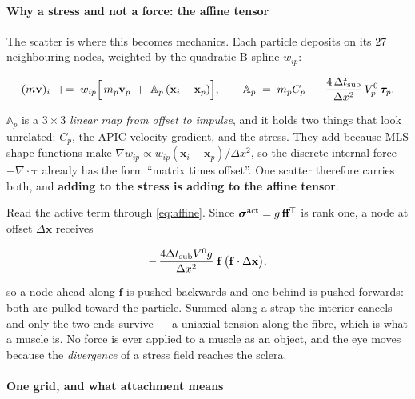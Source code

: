 \documentclass[10pt]{article}
\begin{document}
\paragraph{Why a stress and not a force: the affine tensor}

The scatter is where this becomes mechanics. Each particle deposits on its $27$ neighbouring
nodes, weighted by the quadratic B-spline $w_{ip}$:

\begin{equation}
(m\mathbf{v})_i \;\mathrel{+}=\; w_{ip}\Big[\,m_p\mathbf{v}_p \;+\; \mathbb{A}_p\,(\mathbf{x}_i-\mathbf{x}_p)\Big],
\qquad
\mathbb{A}_p \;=\; m_p C_p \;-\; \frac{4\,\Delta t_{\rm sub}}{\Delta x^{2}}\,V^{0}_p\,\boldsymbol\tau_p .
\label{eq:affine}
\end{equation}

$\mathbb{A}_p$ is a $3\times3$ \emph{linear map from offset to impulse}, and it holds two
things that look unrelated: $C_p$, the APIC velocity gradient, and the stress. They add
because MLS shape functions make $\nabla w_{ip}\propto
w_{ip}(\mathbf{x}_i-\mathbf{x}_p)/\Delta x^2$, so the discrete internal force
$-\nabla\!\cdot\!\boldsymbol\tau$ already has the form ``matrix times offset''. One scatter
therefore carries both, and \textbf{adding to the stress is adding to the affine tensor}.

Read the active term through \eqref{eq:affine}. Since $\boldsymbol\sigma^{\rm
act}=g\,\mathbf{f}\mathbf{f}^{\!\top}$ is rank one, a node at offset $\Delta\mathbf{x}$
receives

\begin{equation}
-\,\frac{4\Delta t_{\rm sub}V^0 g}{\Delta x^{2}}\;\mathbf{f}\,\big(\mathbf{f}\cdot\Delta\mathbf{x}\big),
\label{eq:rank1}
\end{equation}

so a node ahead along $\mathbf{f}$ is pushed backwards and one behind is pushed forwards:
both are pulled toward the particle. Summed along a strap the interior cancels and only the
two ends survive --- a uniaxial tension along the fibre, which is what a muscle is. No force
is ever applied to a muscle as an object, and the eye moves because the \emph{divergence} of
a stress field reaches the sclera.

\paragraph{One grid, and what attachment means}
\end{document}
